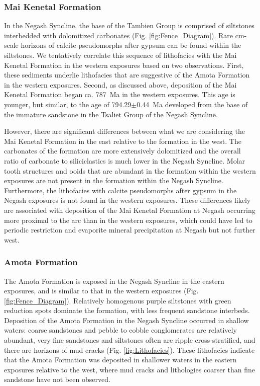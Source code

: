 \documentclass[11pt,letterpaper]{article}
\begin{document}
\subsubsection*{Mai Kenetal Formation}

In the Negash Syncline, the base of the Tambien Group is comprised of siltstones interbedded with dolomitized carbonates (Fig. \ref{fig:Fence_Diagram}). Rare cm-scale horizons of calcite pseudomorphs after gypsum can be found within the siltstones. We tentatively correlate this sequence of lithofacies with the Mai Kenetal Formation in the western exposures based on two observations. First, these sediments underlie lithofacies that are suggestive of the Amota Formation in the western exposures. Second, as discussed above, deposition of the Mai Kenetal Formation began ca. 787~Ma in the western exposures. This age is younger, but similar, to the age of 794.29$\pm$0.44~Ma developed from the base of the immature sandstone in the Tsaliet Group of the Negash Syncline.

However, there are significant differences between what we are considering the Mai Kenetal Formation in the east relative to the formation in the west. The carbonates of the formation are more extensively dolomitized and the overall ratio of carbonate to siliciclastics is much lower in the Negash Syncline. Molar tooth structures and ooids that are abundant in the formation within the western exposures are not present in the formation within the Negash Syncline. Furthermore, the lithofacies with calcite pseudomorphs after gypsum in the Negash exposures is not found in the western exposures. These differences likely are associated with deposition of the Mai Kenetal Formation at Negash occurring more proximal to the arc than in the western exposures, which could have led to periodic restriction and evaporite mineral precipitation at Negash but not further west.

\subsubsection*{Amota Formation}

The Amota Formation is exposed in the Negash Syncline in the eastern exposures, and is similar to that in the western exposures (Fig. \ref{fig:Fence_Diagram}). Relatively homogenous purple siltstones with green reduction spots dominate the formation, with less frequent sandstone interbeds. Deposition of the Amota Formation in the Negash Syncline occurred in shallow waters: coarse sandstones and pebble to cobble conglomerates are relatively abundant, very fine sandstones and siltstones often are ripple cross-stratified, and there are horizons of mud cracks (Fig. \ref{fig:Lithofacies}). These lithofacies indicate that the Amota Formation was deposited in shallower waters in the eastern exposures relative to the west, where mud cracks and lithologies coarser than fine sandstone have not been observed.
\end{document}

